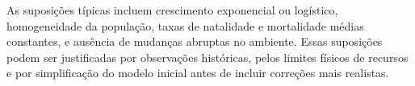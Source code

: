 As suposições típicas incluem crescimento exponencial ou logístico, homogeneidade da população, taxas de natalidade e mortalidade médias constantes, e ausência de mudanças abruptas no ambiente. Essas suposições podem ser justificadas por observações históricas, pelos limites físicos de recursos e por simplificação do modelo inicial antes de incluir correções mais realistas.